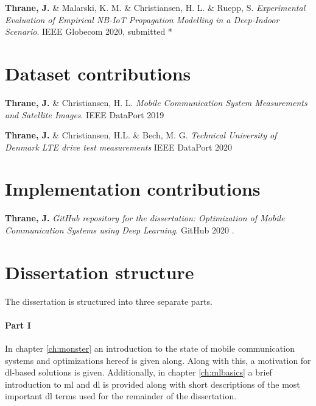 \vspace{2em}
\noindent \textbf{Thrane, J.} \&  Malarski, K. M. \& Christiansen, H. L. \& Ruepp, S. \textit{Experimental Evaluation of Empirical NB-IoT Propagation Modelling in a Deep-Indoor Scenario}. IEEE Globecom 2020, submitted \cite{Thrane2020ExperimentalScenario} *


\section*{Dataset contributions}

\noindent \textbf{Thrane, J.} \& Christiansen, H. L. \textit{Mobile Communication System Measurements and Satellite Images}. IEEE DataPort 2019 \cite{1xf4-eg98-19}

\vspace{2em}
\noindent \textbf{Thrane, J.} \& Christiansen, H.L. \& Bech, M. G. \textit{Technical University of Denmark LTE drive test measurements} IEEE DataPort 2020 \cite{keyt-8g44-20}

\section*{Implementation contributions}

\noindent \textbf{Thrane, J.} \textit{GitHub repository for the dissertation: Optimization of Mobile Communication Systems using Deep Learning}. GitHub 2020 \cite{Thrane2020RepositoryLearning}.


\section*{Dissertation structure}
 
The dissertation is structured into three separate parts. 

\paragraph{Part I} In chapter \ref{ch:monster} an introduction to the state of mobile communication systems and optimizations hereof is given along. Along with this, a motivation for \gls{dl}-based solutions is given. Additionally, in chapter \ref{ch:mlbasics} a brief introduction to \gls{ml} and \gls{dl} is provided along with short descriptions of the most important \gls{dl} terms used for the remainder of the dissertation. 

